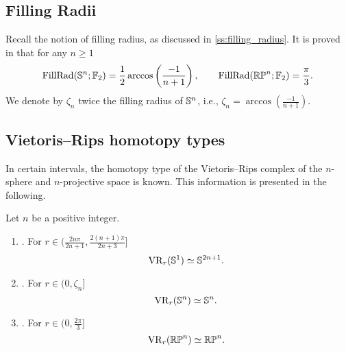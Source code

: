 \subsection{Filling Radii}

Recall the notion of filling radius, as discussed in \cref{ss:filling_radius}.
It is proved in \cite{katz1983filling} that for any $n \geq 1$
\[
\operatorname{FillRad}(\mathbb{S}^n;{\mathbb{F}_2}) = \frac{1}{2}\arccos\left(\frac{-1}{n+1}\right), \qquad
\operatorname{FillRad}(\mathbb{RP}^n;{\mathbb{F}_2}) = \frac{\pi}{3}.
\]
We denote by $\zeta_n$ twice the filling radius of $\mathbb{S}^n$, i.e., $\zeta_n = \arccos(\frac{-1}{n+1})$.

\subsection{Vietoris--Rips homotopy types}\label{prop:homotopy type}

In certain intervals, the homotopy type of the Vietoris--Rips complex of the $n$-sphere and $n$-projective space is known.
This information is presented in the following.

\medskip\proposition Let $n$ be a positive integer.
\begin{enumerate}[{\rm (a)}]
	\item\label{prop:S1}{\rm \cite[Thm.~7.4]{adamaszek2017vietoris}.}
	For $r \in (\frac{2n\pi}{2n+1}, \frac{2(n+1)\pi}{2n+3}]$
	\[
	\operatorname{VR}_r(\mathbb{S}^1) \simeq \mathbb{S}^{2n+1}.
	\]
	
	\item\label{prop:Sn}{\rm \cite[Thm.~10]{lim2020vietoris}.}
	For $r \in (0, \zeta_n]$
	\[
	\operatorname{VR}_r(\mathbb{S}^n) \simeq \mathbb{S}^n.
	\]
	
	\item\label{prop:RPn}{\rm \cite[Thm.~4.5]{adams2022metric}.}
	For $r \in (0,\frac{2\pi}{3} ]$
	\[
	\operatorname{VR}_r(\mathbb{RP}^n) \simeq \mathbb{RP}^n.
	\]
\end{enumerate}
